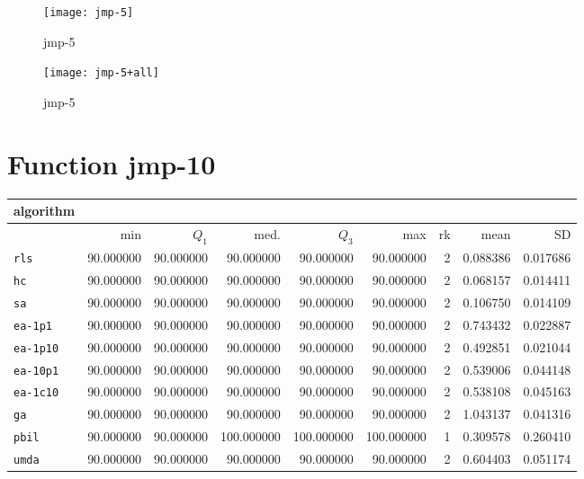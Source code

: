 \begin{center}
\begin{figure}[h]
\centering
\texttt{[image: jmp-5]}
\caption{jmp-5}
\end{figure}
\end{center}

\begin{center}
\begin{figure}[h]
\centering
\texttt{[image: jmp-5+all]}
\caption{jmp-5}
\end{figure}
\end{center}

\newpage

\section{Function jmp-10}
\begin{center}
\begin{tabular}{@{}l*{5}{>{{}}N{3}{0}}>{{}}N{2}{0}N{1}{3}N{1}{3}@{}}
\toprule
{algorithm} &  &  \\
\midrule
& {min} & {$Q_1$} & {med.} & {$Q_3$} & {max} & {rk} & {mean} & {SD} \\
\midrule
\verb|rls| & {\color{blue}} 90.000000 & {\color{blue}} 90.000000 & 90.000000 & 90.000000 & 90.000000 & 2 & 0.088386 & 0.017686 \\
 \verb|hc| & {\color{blue}} 90.000000 & {\color{blue}} 90.000000 & 90.000000 & 90.000000 & 90.000000 & 2 & 0.068157 & 0.014411 \\
 \verb|sa| & {\color{blue}} 90.000000 & {\color{blue}} 90.000000 & 90.000000 & 90.000000 & 90.000000 & 2 & 0.106750 & 0.014109 \\
 \verb|ea-1p1| & {\color{blue}} 90.000000 & {\color{blue}} 90.000000 & 90.000000 & 90.000000 & 90.000000 & 2 & 0.743432 & 0.022887 \\
 \verb|ea-1p10| & {\color{blue}} 90.000000 & {\color{blue}} 90.000000 & 90.000000 & 90.000000 & 90.000000 & 2 & 0.492851 & 0.021044 \\
 \verb|ea-10p1| & {\color{blue}} 90.000000 & {\color{blue}} 90.000000 & 90.000000 & 90.000000 & 90.000000 & 2 & 0.539006 & 0.044148 \\
 \verb|ea-1c10| & {\color{blue}} 90.000000 & {\color{blue}} 90.000000 & 90.000000 & 90.000000 & 90.000000 & 2 & 0.538108 & 0.045163 \\
 \verb|ga| & {\color{blue}} 90.000000 & {\color{blue}} 90.000000 & 90.000000 & 90.000000 & 90.000000 & 2 & 1.043137 & 0.041316 \\
 \verb|pbil| & {\color{blue}} 90.000000 & {\color{blue}} 90.000000 & {\color{blue}} 100.000000 & {\color{blue}} 100.000000 & {\color{blue}} 100.000000 & 1 & 0.309578 & 0.260410 \\
 \verb|umda| & {\color{blue}} 90.000000 & {\color{blue}} 90.000000 & 90.000000 & 90.000000 & 90.000000 & 2 & 0.604403 & 0.051174 \\
 \bottomrule
\end{tabular}
\end{center}

